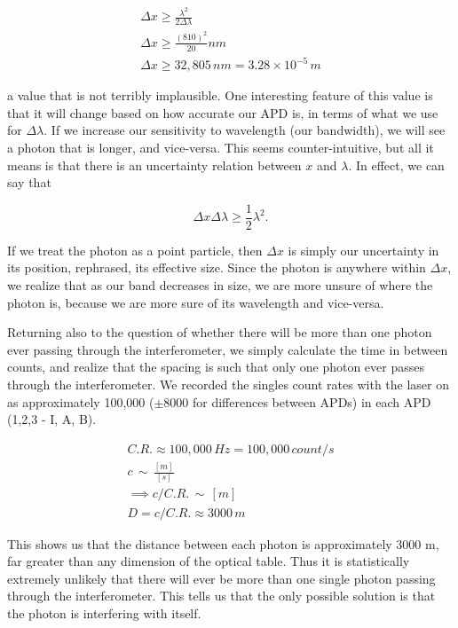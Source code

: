 \documentclass{article}
\begin{document}
\begin{gather}
	\Delta x \geq \frac{\lambda^2}{2\Delta \lambda} \\
	\Delta x \geq \frac{(810)^2}{20} nm \\
	\Delta x \geq 32,805 \, nm = 3.28 \times 10^{-5} \, m
\end{gather}

a value that is not terribly implausible.  One interesting feature of this value is that it will change based on how accurate our APD is, in terms of what we use for $\Delta \lambda$.  If we increase our sensitivity to wavelength (our bandwidth), we will see a photon that is longer, and vice-versa.  This seems counter-intuitive, but all it means is that there is an uncertainty relation between $x$ and $\lambda$.  In effect, we can say that

\begin{equation}
	\Delta x \Delta \lambda \geq \frac{1}{2} \lambda^2.
\end{equation}

If we treat the photon as a point particle, then $\Delta x$ is simply our uncertainty in its position, rephrased, its effective size.  Since the photon is anywhere within $\Delta x$, we realize that as our band decreases in size, we are more unsure of where the photon is, because we are more sure of its wavelength and vice-versa.

\hspace{.5cm}

Returning also to the question of whether there will be more than one photon ever passing through the interferometer, we simply calculate the time in between counts, and realize that the spacing is such that only one photon ever passes through the interferometer.  We recorded the singles count rates with the laser on as approximately 100,000 ($\pm 8000$ for differences between APDs) in each APD (1,2,3 - I, A, B).

\begin{gather*}
	C.R. \approx 100,000 \, H\!z = 100,000 \, count/s \\
	c \, \sim \, \frac{[m]}{[s]} \\
	\implies c/C.R. \, \sim \, [m] \\
	D = c/C.R. \approx 3000 \, m 
\end{gather*}

This shows us that the distance between each photon is approximately 3000 m, far greater than any dimension of the optical table.  Thus it is statistically extremely unlikely that there will ever be more than one single photon passing through the interferometer.  This tells us that the only possible solution is that the photon is interfering with itself.
\end{document}
